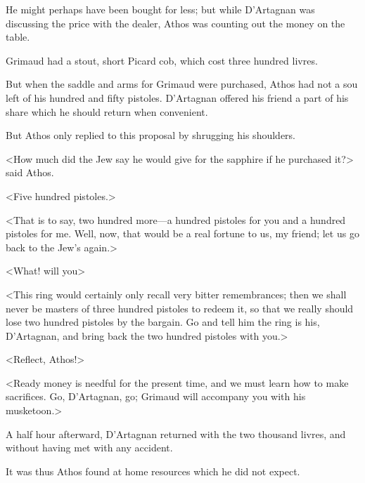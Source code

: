 He might perhaps have been bought for less; but while D'Artagnan was discussing the price with the dealer, Athos was counting out the money on the table. 

Grimaud had a stout, short Picard cob, which cost three hundred livres. 

But when the saddle and arms for Grimaud were purchased, Athos had not a sou left of his hundred and fifty pistoles. D'Artagnan offered his friend a part of his share which he should return when convenient. 

But Athos only replied to this proposal by shrugging his shoulders. 

<How much did the Jew say he would give for the sapphire if he purchased it?> said Athos. 

<Five hundred pistoles.> 

<That is to say, two hundred more—a hundred pistoles for you and a hundred pistoles for me. Well, now, that would be a real fortune to us, my friend; let us go back to the Jew's again.> 

<What! will you\longdash> 

<This ring would certainly only recall very bitter remembrances; then we shall never be masters of three hundred pistoles to redeem it, so that we really should lose two hundred pistoles by the bargain. Go and tell him the ring is his, D'Artagnan, and bring back the two hundred pistoles with you.> 

<Reflect, Athos!> 

<Ready money is needful for the present time, and we must learn how to make sacrifices. Go, D'Artagnan, go; Grimaud will accompany you with his musketoon.> 

A half hour afterward, D'Artagnan returned with the two thousand livres, and without having met with any accident. 

It was thus Athos found at home resources which he did not expect.